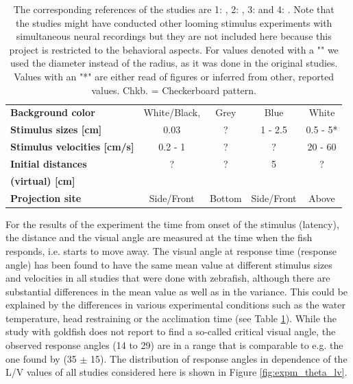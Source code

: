 \begin{table} [!th]
\begin{center}
\begin{tabular}{l|c|c|c|c}
				\textbf{Background color} & White/Black, & Grey & Blue & White\\
				\textbf{Stimulus sizes [cm]} & 0.03 & ? & 1 - 2.5 & 0.5 - 5*\\
				\textbf{Stimulus velocities [cm/s]} & 0.2 - 1 & ? & ? & 20 - 60\\
				\textbf{Initial distances} & ? & ? & 5 & ?\\
				\textbf{(virtual) [cm]} &  &  &  & \\
				\textbf{Projection site} & Side/Front & Bottom & Side/Front & Above\\
			\end{tabular}
		\end{center}
		\caption{The corresponding references of the studies are 1: \cite{Temizer2015}, 
		2: \cite{Dunn2016}, 3: \cite{Bhattacharyya2017} and 4: \cite{Preuss2006}.
		Note that the studies might have conducted other looming stimulus experiments with 
		simultaneous neural recordings but they are not included here because this project is 
		restricted to the behavioral aspects.
		For values denoted with a "\dag" we used the diameter 
		instead of the radius, as it was done in the original studies.
		Values with an "*" are either 
		read of figures or inferred from other, reported values. Chkb. = Checkerboard pattern.}
		\label{tab:looming_exp}
	\end{table}
	For the results of the experiment the time from onset of the stimulus (latency), the distance and the 
	visual angle are measured at the time when the fish responds, i.e. starts to move away.
	The visual angle at response time (response angle) has been found to have the same mean value 
	at different stimulus sizes and velocities in all studies that were done with zebrafish, 
	although there are substantial differences in the mean value as well as in the variance.
	This could be explained by the differences in various experimental conditions such as the water 
	temperature, head restraining or the acclimation time (see Table \ref{tab:looming_exp}).
	While the study with goldfish \citep{Preuss2006} does not report to find a so-called critical visual angle, the observed response angles (14\textdegree{} to 29\textdegree) are in a range 
  	that is comparable to e.g. the one found by \cite{Bhattacharyya2017} (35\textdegree{} $\pm$ 
	15\textdegree).
    The distribution of response angles in dependence of the L/V values of all studies considered here is shown in Figure \ref{fig:expm_theta_lv}.\\
